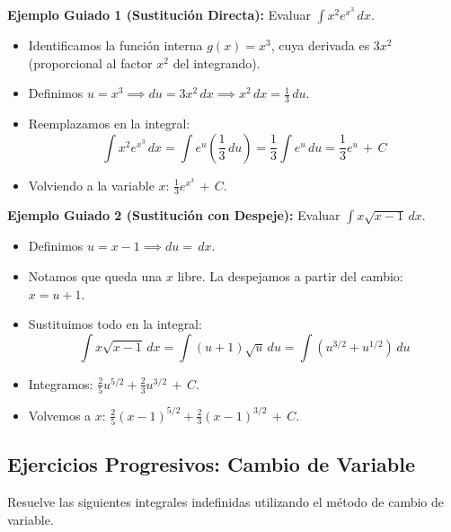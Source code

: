 \documentclass[12pt, letterpaper]{article}
\newcommand{\dx}{\,dx}
\newcommand{\du}{\,du}
\newcommand{\CC}{\,+\,C}
\begin{document}
\noindent\textbf{Ejemplo Guiado 1 (Sustitución Directa):} Evaluar $\int x^2 e^{x^3} \dx$.
\begin{itemize}
  \item Identificamos la función interna $g(x) = x^3$, cuya derivada es $3x^2$ (proporcional al factor $x^2$ del integrando).
  \item Definimos $u = x^3 \implies du = 3x^2 \dx \implies x^2 \dx = \frac{1}{3} \du$.
  \item Reemplazamos en la integral:
    $$\int x^2 e^{x^3} \dx = \int e^{u} \left(\frac{1}{3}\du\right) = \frac{1}{3}\int e^u \du = \frac{1}{3}e^u \CC$$
  \item Volviendo a la variable $x$: $\frac{1}{3}e^{x^3} \CC$.
\end{itemize}

\noindent\textbf{Ejemplo Guiado 2 (Sustitución con Despeje):} Evaluar $\int x\sqrt{x-1}\dx$.
\begin{itemize}
  \item Definimos $u = x-1 \implies du = \dx$.
  \item Notamos que queda una $x$ libre. La despejamos a partir del cambio: $x = u+1$.
  \item Sustituimos todo en la integral:
    $$\int x\sqrt{x-1}\dx = \int (u+1)\sqrt{u}\du = \int (u^{3/2} + u^{1/2})\du$$
  \item Integramos: $\frac{2}{5}u^{5/2} + \frac{2}{3}u^{3/2} \CC$.
  \item Volvemos a $x$: $\frac{2}{5}(x-1)^{5/2} + \frac{2}{3}(x-1)^{3/2} \CC$.
\end{itemize}

\newpage

\subsection{Ejercicios Progresivos: Cambio de Variable}
Resuelve las siguientes integrales indefinidas utilizando el método de cambio de variable.
\end{document}
